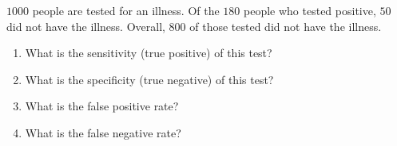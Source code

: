 \documentclass[../main.tex]{subfiles}
\begin{document}
\begin{exercise} \label{ex:errors-midterm-2022}
  \(1000\) people are tested for an illness. Of the \(180\) people who tested positive, \(50\) did not have the illness. Overall, \(800\) of those tested did not have the illness.

  \begin{enumerate}
    \item What is the sensitivity (true positive) of this test?
    \item What is the specificity (true negative) of this test?
    \item What is the false positive rate?
    \item What is the false negative rate?
  \end{enumerate}

  \blanks*
\end{exercise}
\clearpage
\end{document}

